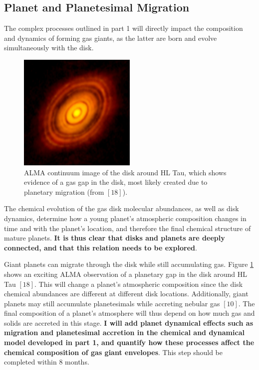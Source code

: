 \documentclass[12pt, letterpaper]{article}
\begin{document}


\subsection{Planet and Planetesimal Migration}

The complex processes outlined in part 1 will directly impact the composition and dynamics of forming gas giants, as the latter are born and evolve simultaneously with the disk. 
\begin{figure}[h!]
\centering
\includegraphics[width=0.5\textwidth]{HLTau_nrao}
\caption{ALMA continuum image of the disk around HL Tau, which shows evidence of a gas gap in the disk, most likely created due to planetary migration (from $[18]$).}
\label{fig:HLtau}
\end{figure}
The chemical evolution of the gas disk molecular abundances, as well as disk dynamics, determine how a young planet's atmospheric composition changes in time and with the planet's location, and therefore the final chemical structure of mature planets. \textbf{It is thus clear that disks and planets are deeply connected, and that this relation needs to be explored}. %

Giant planets can migrate through the disk while still accumulating gas. Figure \ref{fig:HLtau} shows an exciting ALMA observation of a planetary gap in the disk around HL Tau $[18]$. This will change a planet's atmospheric composition since the disk chemical abundances are different at different disk locations. Additionally, giant planets may still accumulate planetesimals while accreting nebular gas $[10]$. The final composition of a planet's atmosphere will thus depend on how much gas and solids are accreted in this stage. \textbf{I will add planet dynamical effects such as migration and planetesimal accretion in the chemical and dynamical model developed in part 1, and quantify how these processes affect the chemical composition of gas giant envelopes}. This step should be completed within 8 months.
\end{document}
